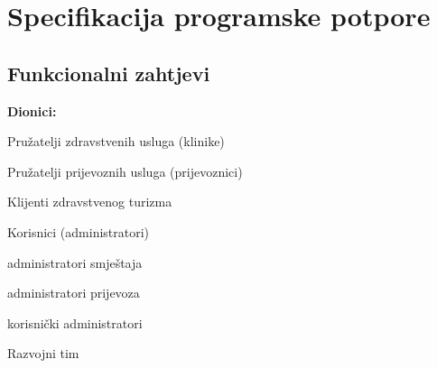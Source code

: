 \chapter{Specifikacija programske potpore}
		
	\section{Funkcionalni zahtjevi}
			\noindent \textbf{Dionici:}
			\begin{packed_enum}
				\item Pružatelji zdravstvenih usluga (klinike)
				\item Pružatelji prijevoznih usluga (prijevoznici)
				\item Klijenti zdravstvenog turizma
				\item Korisnici (administratori)
				\begin{packed_enum}
					\item[a)] administratori smještaja
					\item[b)] administratori prijevoza
					\item[c)] korisnički administratori
				\end{packed_enum}
				\item Razvojni tim
			\end{packed_enum}
			
